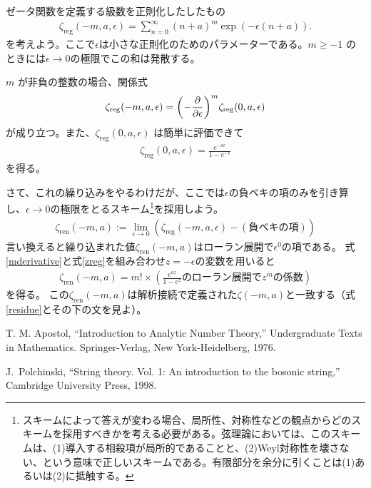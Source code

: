 \documentclass[12pt,a4paper,dvipdfmx]{jlreq}
\newcommand{\zreg}{\zeta_{\mathrm{reg}}}
\newcommand{\zren}{\zeta_{\mathrm{ren}}}
\begin{document}
ゼータ関数を定義する級数を正則化したしたもの
\begin{align}
  \zreg(-m,a,\epsilon)=\sum_{n=0}^{\infty}(n+a)^m\exp(-\epsilon(n+a)).
\end{align}
を考えよう。ここで$\epsilon$は小さな正則化のためのパラメーターである。$m \ge -1$ のときには$\epsilon\to 0$の極限でこの和は発散する。

$m$ が非負の整数の場合、関係式
\begin{align}
  \zreg(-m,a,\epsilon)=\qty(-\pdv{\epsilon})^{m}\zreg(0,a,\epsilon)\label{mderivative}
\end{align}
が成り立つ。また、$\zreg(0,a,\epsilon)$ は簡単に評価できて
\begin{align}
  \zreg(0,a,\epsilon)=\frac{e^{-a\epsilon}}{1-e^{-\epsilon}}\label{zreg}
\end{align}
を得る。

さて、これの繰り込みをやるわけだが、ここでは$\epsilon$の負ベキの項のみを引き算し、$\epsilon\to0$の極限をとるスキーム\footnote{スキームによって答えが変わる場合、局所性、対称性などの観点からどのスキームを採用すべきかを考える必要がある。弦理論においては、このスキームは、(1)導入する相殺項が局所的であることと、(2)Weyl対称性を壊さない、という意味で正しいスキームである。有限部分を余分に引くことは(1)あるいは(2)に抵触する。}を採用しよう。
\begin{align}
  \zren(-m,a):=\lim_{\epsilon\to 0} (\zreg(-m,a,\epsilon)-(\text{負ベキの項}))
\end{align}
言い換えると繰り込まれた値$\zren(-m,a)$はローラン展開で$\epsilon^0$の項である。
式\eqref{mderivative}と式\eqref{zreg}を組み合わせ$z=-\epsilon$の変数を用いると
\begin{align}
  \zren(-m,a)=m!\times (\frac{e^{az}}{1-e^{z}}\text{のローラン展開で} z^m \text{の係数} )
\end{align}
を得る。
この$\zren(-m,a)$は解析接続で定義された$\zeta(-m,a)$と一致する（式\eqref{residue}とその下の文を見よ）。
\begin{thebibliography}{9}
  T. M. Apostol, ``Introduction to Analytic Number Theory,''
  Undergraduate Texts in Mathematics. Springer-Verlag, New York-Heidelberg, 1976.

J.~Polchinski,
``String theory. Vol. 1: An introduction to the bosonic string,'' Cambridge University Press, 1998.

\end{thebibliography}
\end{document}
